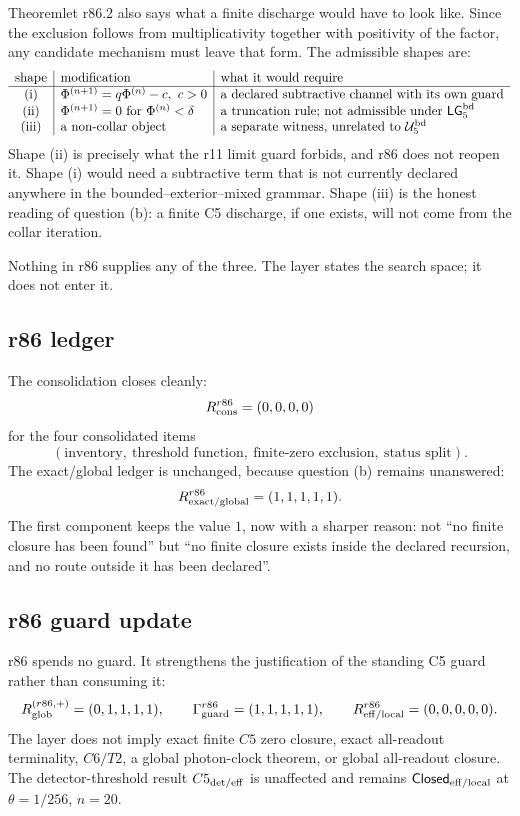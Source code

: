 Theoremlet r86.2 also says what a finite discharge would have to look like.  Since the
exclusion follows from multiplicativity together with positivity of the factor, any candidate
mechanism must leave that form.  The admissible shapes are:
\[
\begin{array}{c|l|l}
\text{shape} & \text{modification} & \text{what it would require}\\
\hline
\text{(i)} & \Phi^{(n+1)}=q\Phi^{(n)}-c,\ c>0 &
\text{a declared subtractive channel with its own guard}\\
\text{(ii)} & \Phi^{(n+1)}=0\text{ for }\Phi^{(n)}<\delta &
\text{a truncation rule; not admissible under }\mathsf{LG}_5^{\rm bd}\\
\text{(iii)} & \text{a non-collar object} &
\text{a separate witness, unrelated to }\mathcal U_5^{\rm bd}
\end{array}
\]
Shape (ii) is precisely what the r11 limit guard forbids, and r86 does not reopen it.
Shape (i) would need a subtractive term that is not currently declared anywhere in the
bounded--exterior--mixed grammar.  Shape (iii) is the honest reading of question (b): a
finite C5 discharge, if one exists, will not come from the collar iteration.

Nothing in r86 supplies any of the three.  The layer states the search space; it does not
enter it.

\subsection*{r86 ledger}
\label{subsec:r86-ledger}

The consolidation closes cleanly:
\[
R_{\rm cons}^{r86}=(0,0,0,0)
\]
for the four consolidated items
\[
(\text{inventory},\ \text{threshold function},\ \text{finite-zero exclusion},
\ \text{status split}).
\]
The exact/global ledger is unchanged, because question (b) remains unanswered:
\[
R_{\rm exact/global}^{r86}=(1,1,1,1,1).
\]
The first component keeps the value \(1\), now with a sharper reason: not ``no finite
closure has been found'' but ``no finite closure exists inside the declared recursion, and
no route outside it has been declared''.

\subsection*{r86 guard update}
\label{subsec:r86-guard-update}

r86 spends no guard.  It strengthens the justification of the standing C5 guard rather than
consuming it:
\[
R_{\rm glob}^{(r86,+)}=(0,1,1,1,1),
\qquad
\Gamma_{\rm guard}^{r86}=(1,1,1,1,1),
\qquad
R_{\rm eff/local}^{r86}=(0,0,0,0,0).
\]
The layer does not imply exact finite \(C5\) zero closure, exact all-readout terminality,
\(C6/T2\), a global photon-clock theorem, or global all-readout closure.  The
detector-threshold result \(C5_{\rm det/eff}\) is unaffected and remains
\(\mathsf{Closed}_{\rm eff/local}\) at \(\theta=1/256\), \(n=20\).

